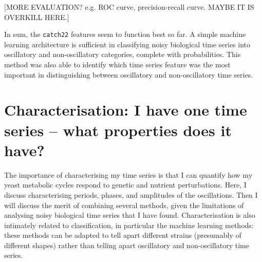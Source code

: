 [MORE EVALUATION? e.g. ROC curve, precision-recall curve.  MAYBE IT IS OVERKILL HERE.]

In sum,
the \texttt{catch22} features seem to function best so far.
A simple machine learning architecture is sufficient in classifying noisy biological time series into oscillatory and non-oscillatory categories, complete with probabilities.
This method was also able to identify which time series feature was the most important in distinguishing between oscillatory and non-oscillatory time series.

\section[Characterisation]{Characterisation: I have one time series -- what properties does it have?}
\label{sec:analysis-characterisation}

The importance of characterising my time series is that I can quantify how my yeast metabolic cycles respond to genetic and nutrient perturbations.
Here, I discuss characterising periods, phases, and amplitudes of the oscillations.
Then I will discuss the merit of combining several methods, given the limitations of analysing noisy biological time series that I have found.
Characterisation is also intimately related to classification, in particular the machine learning methods: these methods can be adapted to tell apart different strains (presumably of different shapes) rather than telling apart oscillatory and non-oscillatory time series.

